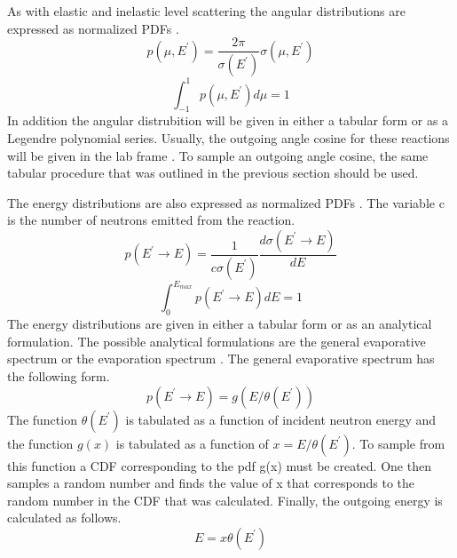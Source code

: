 As with elastic and inelastic level scattering the angular distributions are
expressed as normalized PDFs 
\citep{chadwick_endf/b-vii.1_2011}. 
\begin{equation*}
  p(\mu,E^{'}) = \frac{2\pi}{\sigma(E^{'})}\sigma(\mu,E^{'})
\end{equation*}
\begin{equation*}
  \int_{-1}^1p(\mu,E^{'})d\mu = 1
\end{equation*}
In addition the angular distrubition will be given in either a tabular form or
as a Legendre polynomial series. Usually, the outgoing angle cosine for these
reactions will be given in the lab frame \citep{chadwick_endf/b-vii.1_2011}. To
sample an outgoing angle cosine, the same tabular procedure that was outlined 
in the previous section should be used. 

The energy distributions are also expressed as normalized PDFs 
\citep{chadwick_endf/b-vii.1_2011}. The variable c is the number of neutrons
emitted from the reaction.
\begin{equation}
  p(E^{'} \to E) = \frac{1}{c\sigma(E^{'})}\frac{d\sigma(E^{'} \to E)}{dE}
\end{equation}
\begin{equation}
  \int_0^{E_{max}}p(E^{'} \to E)dE = 1
\end{equation}
The energy distributions are given in either a tabular form or as an analytical
formulation. The possible analytical formulations are the general evaporative
spectrum or the evaporation spectrum \citep{chadwick_endf/b-vii.1_2011}. The 
general evaporative spectrum has the following form.
\begin{equation}
  p(E^{'} \to E) = g(E/\theta(E^{'}))
\end{equation}
The function $\theta(E^{'})$ is tabulated as a function of incident neutron 
energy and the function $g(x)$ is tabulated as a function of 
$x = E/\theta(E^{'})$. To sample from this function a CDF corresponding to 
the pdf g(x) must be created. One then samples a random number and finds the
value of x that corresponds to the random number in the CDF that was 
calculated. Finally, the outgoing energy is calculated as follows.
\begin{equation}
  E = x\theta(E^{'})
\end{equation}

